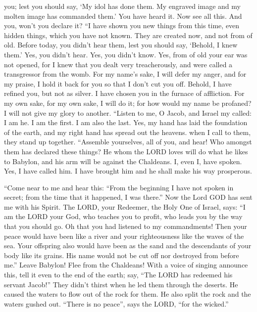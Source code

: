 you; lest you should say, `My idol has done them. My engraved image and
my molten image has commanded them.'  You have heard it.
Now see all this. And you, won't you declare it? ``I have shown you new
things from this time, even hidden things, which you have not known.
 They are created now, and not from of old. Before today,
you didn't hear them, lest you should say, `Behold, I knew them.'
 Yes, you didn't hear. Yes, you didn't know. Yes, from of
old your ear was not opened, for I knew that you dealt very
treacherously, and were called a transgressor from the womb.
 For my name's sake, I will defer my anger, and for my
praise, I hold it back for you so that I don't cut you off.
 Behold, I have refined you, but not as silver. I have
chosen you in the furnace of affliction.  For my own
sake, for my own sake, I will do it; for how would my name be profaned?
I will not give my glory to another.  ``Listen to me, O
Jacob, and Israel my called: I am he. I am the first. I am also the
last.  Yes, my hand has laid the foundation of the earth,
and my right hand has spread out the heavens. when I call to them, they
stand up together.  ``Assemble yourselves, all of you,
and hear! Who amongst them has declared these things? He whom the LORD
loves will do what he likes to Babylon, and his arm will be against the
Chaldeans.  I, even I, have spoken. Yes, I have called
him. I have brought him and he shall make his way prosperous.

 ``Come near to me and hear this: ``From the beginning I
have not spoken in secret; from the time that it happened, I was
there.'' Now the Lord GOD has sent me with his Spirit. 
The LORD, your Redeemer, the Holy One of Israel, says: ``I am the LORD
your God, who teaches you to profit, who leads you by the way that you
should go.  Oh that you had listened to my commandments!
Then your peace would have been like a river and your righteousness like
the waves of the sea.  Your offspring also would have
been as the sand and the descendants of your body like its grains. His
name would not be cut off nor destroyed from before me.''
 Leave Babylon! Flee from the Chaldeans! With a voice of
singing announce this, tell it even to the end of the earth; say, ``The
LORD has redeemed his servant Jacob!''  They didn't
thirst when he led them through the deserts. He caused the waters to
flow out of the rock for them. He also split the rock and the waters
gushed out.  ``There is no peace'', says the LORD, ``for
the wicked.''


